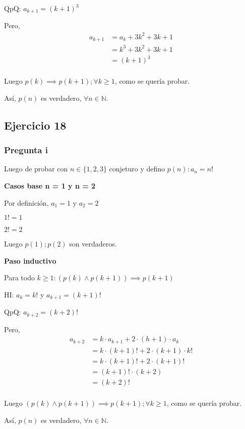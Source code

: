 QpQ: $ a_{k+1} = (k+1)^3$

Pero,
\begin{align*}
    a_{k+1} &= a_k + 3k^2 + 3k + 1 \\
    &= k^3 + 3k^2 + 3k + 1 \\
    &= (k+1)^3 \\
\end{align*}

Luego $p(k) \implies p(k+1); \forall k \geq 1$, como se quería probar.

Así, $p(n)$ es verdadero, $\forall n \in \mathbb{N}$.

\subsection{Ejercicio 18}

\subsubsection{Pregunta i}

Luego de probar con $ n \in \{ 1,2,3 \} $ conjeturo y defino $ p(n): a_n = n! $

\textbf{Casos base n = 1 y n = 2}

Por definición, $a_1 = 1$ y $a_2 = 2$

$ 1! = 1$

$ 2! = 2 $

Luego $ p(1); p(2) $ son verdaderos.

\textbf{Paso inductivo}

Para todo $k \geq 1: (p(k) \wedge p(k+1)) \implies p(k+1)$

HI: $ a_k = k! $ y $ a_{k+1} = (k+1)! $

QpQ: $ a_{k+2} = (k+2)!$

Pero,
\begin{align*}
    a_{k+2} &= k \cdot a_{k+1} +2\cdot (h+1) \cdot a_k \\
    &= k \cdot (k+1)! +2\cdot (k+1) \cdot k! \\
    &= k \cdot (k+1)! +2\cdot (k+1)! \\
    &= (k+1)! \cdot (k+2) \\
    &= (k+2)! \\
\end{align*}

Luego $(p(k) \wedge p(k+1)) \implies p(k+1); \forall k \geq 1$, como se quería probar.

Así, $p(n)$ es verdadero, $\forall n \in \mathbb{N}$.

